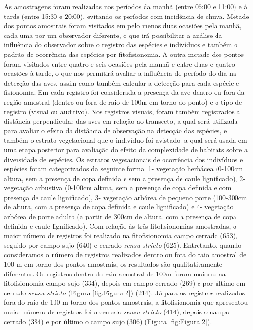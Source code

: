 As amostragens foram realizadas nos períodos da manhã (entre 06:00 e 11:00) e à tarde (entre 15:30 e 20:00), evitando os períodos com incidência de chuva. Metade dos pontos amostrais foram visitados em pelo menos duas ocasiões pela manhã, cada uma por um observador diferente, o que irá possibilitar a análise da influência do observador sobre o registro das espécies e indivíduos e também o padrão de ocorrência das espécies por fitofisionomia. A outra metade dos pontos foram visitados entre quatro e seis ocasiões pela manhã e entre duas e quatro ocasiões à tarde, o que nos permitirá avaliar a influência do período do dia na detecção das aves, assim como também calcular a detecção para cada espécie e fisionomia. Em cada registro foi considerada a presença da ave dentro ou fora da região amostral (dentro ou fora de raio de 100m em torno do ponto) e o tipo de registro (visual ou auditivo). Nos registros visuais, foram também registrados a distância perpendicular das aves em relação ao transecto, a qual será utilizada para avaliar o efeito da distância de observação na detecção das espécies, e também o estrato vegetacional que o indivíduo foi avistado, a qual será usada em uma etapa posterior para avaliação do efeito da complexidade de habitats sobre a diversidade de espécies. Os estratos vegetacionais de ocorrência dos indivíduos e espécies foram categorizados da seguinte forma: 1- vegetação herbácea (0-100cm altura, sem a presença de copa definida e sem a presença de caule lignificado), 2- vegetação arbustiva (0-100cm altura, sem a presença de copa definida e com presença de caule lignificado), 3- vegetação arbórea de pequeno porte (100-300cm de altura, com a presença de copa definida e caule lignificado) e 4- vegetação arbórea de porte adulto (a partir de 300cm de altura, com a presença de copa definida e caule lignificado).
Com relação às três fitofisionomias amostradas, o maior número de registros foi realizado na fitofisionomia campo cerrado (653), seguido por campo sujo (640) e cerrado \textit{sensu stricto} (625). Entretanto, quando consideramos o número de registros realizados dentro ou fora do raio amostral de 100 m em torno dos pontos amostrais, os resultados são qualitativamente diferentes.
Os registros dentro do raio amostral de 100m foram maiores na fitofisionomia campo sujo (334), depois em campo cerrado (269) e por último em cerrado \textit{sensu stricto} (Figura \ref{fig:Figura 2}) (214). Já para os registros realizados fora do raio de 100 m torno dos pontos amostrais, a fitofisionomia que apresentou maior número de registros foi o cerrado \textit{sensu stricto} (414), depois o campo cerrado (384) e por último o campo sujo (306) (Figura \ref{fig:Figura 2}).
